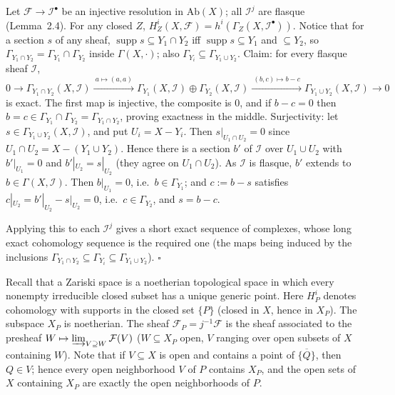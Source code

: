 \documentclass[11pt]{article}
\begin{document}
\pf
Let $\mathcal F\to\mathcal I^\bullet$ be an injective resolution in $\mathrm{Ab}(X)$; all $\mathcal I^j$ are flasque (Lemma~2.4). For any closed $Z$, $H^i_Z(X,\mathcal F)=h^i(\Gamma_Z(X,\mathcal I^\bullet))$. Notice that for a section $s$ of any sheaf, $\operatorname{supp}s\subseteq Y_1\cap Y_2$ iff $\operatorname{supp}s\subseteq Y_1$ and $\subseteq Y_2$, so $\Gamma_{Y_1\cap Y_2}=\Gamma_{Y_1}\cap\Gamma_{Y_2}$ inside $\Gamma(X,\cdot)$; also $\Gamma_{Y_i}\subseteq\Gamma_{Y_1\cup Y_2}$. Claim: for every flasque sheaf $\mathcal I$,
\[
0\to\Gamma_{Y_1\cap Y_2}(X,\mathcal I)\xrightarrow{\ a\mapsto(a,a)\ }\Gamma_{Y_1}(X,\mathcal I)\oplus\Gamma_{Y_2}(X,\mathcal I)\xrightarrow{\ (b,c)\mapsto b-c\ }\Gamma_{Y_1\cup Y_2}(X,\mathcal I)\to0
\]
is exact. The first map is injective, the composite is $0$, and if $b-c=0$ then $b=c\in\Gamma_{Y_1}\cap\Gamma_{Y_2}=\Gamma_{Y_1\cap Y_2}$, proving exactness in the middle. Surjectivity: let $s\in\Gamma_{Y_1\cup Y_2}(X,\mathcal I)$, and put $U_i=X-Y_i$. Then $s|_{U_1\cap U_2}=0$ since $U_1\cap U_2=X-(Y_1\cup Y_2)$. Hence there is a section $b'$ of $\mathcal I$ over $U_1\cup U_2$ with $b'|_{U_1}=0$ and $b'|_{U_2}=s|_{U_2}$ (they agree on $U_1\cap U_2$). As $\mathcal I$ is flasque, $b'$ extends to $b\in\Gamma(X,\mathcal I)$. Then $b|_{U_1}=0$, i.e.\ $b\in\Gamma_{Y_1}$; and $c:=b-s$ satisfies $c|_{U_2}=b'|_{U_2}-s|_{U_2}=0$, i.e.\ $c\in\Gamma_{Y_2}$, and $s=b-c$.

Applying this to each $\mathcal I^j$ gives a short exact sequence of complexes, whose long exact cohomology sequence is the required one (the maps being induced by the inclusions $\Gamma_{Y_1\cap Y_2}\subseteq\Gamma_{Y_i}\subseteq\Gamma_{Y_1\cup Y_2}$). \hfill$\square$

\pf
Recall that a Zariski space is a noetherian topological space in which every nonempty irreducible closed subset has a unique generic point. Here $H^i_P$ denotes cohomology with supports in the closed set $\{P\}$ (closed in $X$, hence in $X_P$). The subspace $X_P$ is noetherian. The sheaf $\mathcal F_P=j^{-1}\mathcal F$ is the sheaf associated to the presheaf $W\mapsto\varinjlim_{V\supseteq W}\mathcal F(V)$ ($W\subseteq X_P$ open, $V$ ranging over open subsets of $X$ containing $W$). Note that if $V\subseteq X$ is open and contains a point of $\overline{\{Q\}}$, then $Q\in V$; hence every open neighborhood $V$ of $P$ contains $X_P$, and the open sets of $X$ containing $X_P$ are exactly the open neighborhoods of $P$.
\end{document}
